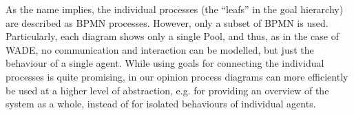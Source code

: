 As the name implies, the individual processes (the ``leafs'' in the goal hierarchy)
are described as BPMN processes.  However, only a subset of BPMN is used.
Particularly, each diagram shows only a single Pool, and thus, as in the case of
WADE, no communication and interaction can be modelled, but just the behaviour of
a single agent.  While using goals for connecting the individual processes is
quite promising, in our opinion process diagrams can more efficiently be used at
a higher level of abstraction, e.g. for providing an overview of the system as a
whole, instead of for isolated behaviours of individual agents.

